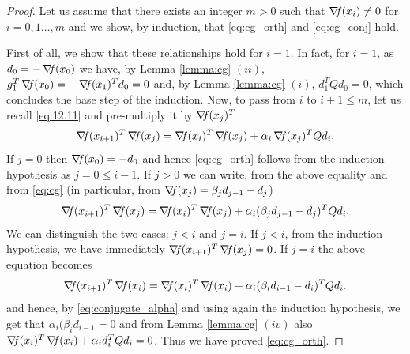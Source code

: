 \documentclass[10pt,a4paper]{article}
\begin{document}
\begin{proof}
	Let us assume that there exists an integer $m > 0$ such that $\operatorname*{\mathit{\nabla \!f}}(x_i) \neq 0$ for $i = 0, 1 \ldots, m$ and we show, by induction, that \eqref{eq:cg_orth} and \eqref{eq:cg_conj} hold.

First of all, we show that these relationships hold for $i = 1$. In fact, for $i = 1$, as $d_0 = -\operatorname*{\mathit{\nabla \!f}}(x_0)$ we have, by Lemma \ref{lemma:cg} $(ii)$, $g_1^T \operatorname*{\mathit{\nabla \!f}}(x_0) = -\operatorname*{\mathit{\nabla \!f}}(x_1)^T d_0 = 0$ and, by Lemma \ref{lemma:cg} $(i)$, $d_1^T Q d_0 = 0$, which concludes the base step of the induction. Now, to pass from $i$ to $i+1\leq m$, 
let us recall \eqref{eq:12.11} and pre-multiply it by $\operatorname*{\mathit{\nabla \!f}}(x_j)^T$
\begin{equation*}
	\operatorname*{\mathit{\nabla \!f}}(x_{i+1})^T \operatorname*{\mathit{\nabla \!f}}(x_j) = \operatorname*{\mathit{\nabla \!f}}(x_i)^T \operatorname*{\mathit{\nabla \!f}}(x_j) + \alpha_i \operatorname*{\mathit{\nabla \!f}}(x_j)^T Q d_i.
\end{equation*}
If $j = 0$ then $\operatorname*{\mathit{\nabla \!f}}(x_0) = -d_0$ and hence \eqref{eq:cg_orth} follows from the induction hypothesis as $j=0\leq i-1$. If $j > 0$ we can write, from the above equality and from \eqref{eq:cg} (in particular, from $\operatorname*{\mathit{\nabla \!f}}(x_j)= \beta_j d_{j-1} - d_j$)
\begin{equation*}
	\operatorname*{\mathit{\nabla \!f}}(x_{i+1})^T \operatorname*{\mathit{\nabla \!f}}(x_j) = \operatorname*{\mathit{\nabla \!f}}(x_i)^T \operatorname*{\mathit{\nabla \!f}}(x_j) + \alpha_i (\beta_j d_{j-1} - d_j)^T Q d_i.
\end{equation*}
We can distinguish the two cases: $j < i$ and $j = i$. If $j < i$, from the induction hypothesis, we have immediately $\operatorname*{\mathit{\nabla \!f}}(x_{i+1})^T \operatorname*{\mathit{\nabla \!f}}(x_j) = 0$. If $j = i$ the above equation becomes
\begin{equation*}
	\operatorname*{\mathit{\nabla \!f}}(x_{i+1})^T \operatorname*{\mathit{\nabla \!f}}(x_i) = \operatorname*{\mathit{\nabla \!f}}(x_i)^T \operatorname*{\mathit{\nabla \!f}}(x_i) + \alpha_i (\beta_i d_{i-1} - d_i)^T Q d_i.
\end{equation*}
and hence, by \eqref{eq:conjugate_alpha} and using again the induction hypothesis, we get that $\alpha_i (\beta_i d_{i-1}=0$ and from Lemma \ref{lemma:cg} $(iv)$ also $\operatorname*{\mathit{\nabla \!f}}(x_i)^T \operatorname*{\mathit{\nabla \!f}}(x_i) + \alpha_i d_i^T Q d_i=0$. Thus we have proved \eqref{eq:cg_orth}.


\end{proof}
\end{document}
